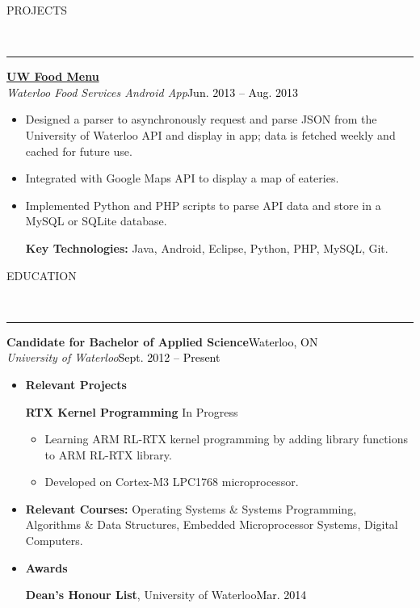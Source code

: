 \documentclass[11pt, letterpaper, oneside]{article}
\newcommand{\HRule}[2]{\textcolor{#1}{\rule{\linewidth}{#2}}}
\newcommand{\sectiontitle}[1]{\begin{minipage}{\textwidth}\vspace{-7.5pt}\begin{flushleft}\hspace{-20.5pt}\vspace{-25pt}
\Large\MakeUppercase{#1}\end{flushleft}\end{minipage}\\\HRule{black}{0.15mm}\vspace{\baselineskip}}
\newenvironment{ressection}[1]{
  \sectiontitle{#1}}
  {\vspace{-\baselineskip}}
\newcommand{\resentryheader}[4]{
    \vspace{-6pt}
    \textbf{#1}\hspace{\stretch{1}}\textcolor{black}{#3}\\
    \textit{#2}\hspace{\stretch{1}}\textcolor{black}{#4}\\
}
\newcommand{\resitem}[1]{
    \vspace{2pt}
    \item \begin{flushleft} #1 \end{flushleft}
}
\newcommand{\resinneritem}[1]{
	\vspace{-5pt}
    \item \begin{flushleft} #1 \end{flushleft}
}
\newcommand{\resawardentry}[3]{
  \begin{minipage}{6.3in}
  \hspace{-24pt}\textbf{#1},
  {#2}\hfill\textcolor{black}{#3}\\
  \vspace{-5pt}
  \vspace{0.5\baselineskip}
  \end{minipage}
}
\newenvironment{resentry}[4]{
  \begin{minipage}{\textwidth}
  \vspace{-3pt}
    \resentryheader{#1}{#2}{#3}{#4}
        \vspace{-\baselineskip}
    \begin{itemize}[noitemsep,nolistsep]
}{
    \end{itemize}
        \vspace{\baselineskip}
        \end{minipage}
}
\begin{document}
\begin{ressection}{Projects}
  \begin{resentry}{\href{https://play.google.com/store/apps/details?id=ca.uwaterloo.uwfoodservices&hl=en}{UW Food Menu}}{Waterloo Food Services Android App}{}{Jun. 2013 -- Aug. 2013}
    \resitem{Designed a parser to asynchronously request and parse JSON from the University of Waterloo API and display in app; data is fetched weekly and cached for future use.}
    \resitem{Integrated with Google Maps API to display a map of eateries.}
    \resitem{Implemented Python and PHP scripts to parse API data and store in a MySQL or SQLite database.}
    \vspace{4pt} \hspace{-15pt}
    \textbf{Key Technologies:} Java, Android, Eclipse, Python, PHP, MySQL, Git.
  \end{resentry}
\end{ressection}

\begin{ressection}{Education}
  \begin{resentry}{Candidate for Bachelor of Applied Science}{University of Waterloo}{Waterloo, ON}{Sept. 2012 -- Present}
    \resitem{\textbf{Relevant Projects}}
	\textbf{\hspace{5pt} RTX Kernel Programming} \hfill In Progress   
    \begin{itemize}
		\resinneritem{Learning ARM RL-RTX kernel programming by adding library functions to ARM RL-RTX library.}
		\resinneritem{Developed on Cortex-M3 LPC1768 microprocessor.}
	\end{itemize}
	 \vspace{-4pt}
	\resitem{\textbf{Relevant Courses:} Operating Systems \& Systems Programming, Algorithms \& Data Structures, Embedded Microprocessor Systems, Digital Computers.}
	\resitem{\textbf{Awards}}
	\begin{itemize}
  	\resawardentry{\hspace{5pt} Dean's Honour List}{University of Waterloo}{Mar. 2014}
	\end{itemize}
  \end{resentry}
\end{ressection}
\end{document}
